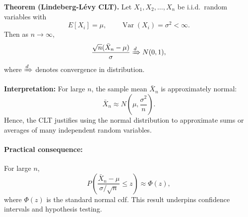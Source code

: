 \documentclass[12pt]{article}
\begin{document}
\textbf{Theorem (Lindeberg-Lévy CLT).}
Let $X_1, X_2, \dots, X_n$ be i.i.d.\ random variables with
\[
E[X_i]=\mu, \qquad \operatorname{Var}(X_i)=\sigma^2<\infty.
\]
Then as $n\to\infty$,
\[
\frac{\sqrt{n}(\bar{X}_n - \mu)}{\sigma}
\xRightarrow{d} N(0,1),
\]
where $\xRightarrow{d}$ denotes convergence in distribution.

\textbf{Interpretation:}  
For large $n$, the sample mean $\bar{X}_n$ is approximately normal:
\[
\bar{X}_n \approx N\!\left(\mu, \frac{\sigma^2}{n}\right).
\]
Hence, the CLT justifies using the normal distribution to approximate sums or averages of many independent random variables.

\paragraph{Practical consequence:}
For large $n$,
\[
P\!\left(\frac{\bar{X}_n - \mu}{\sigma/\sqrt{n}} \le z\right) \approx \Phi(z),
\]
where $\Phi(z)$ is the standard normal cdf.  
This result underpins confidence intervals and hypothesis testing.
\end{document}
